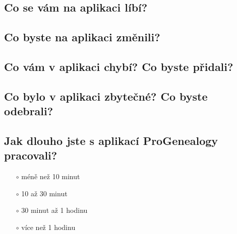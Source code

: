 		\subsection*{Co se vám na aplikaci líbí?}
		\dotfill
		\subsection*{Co byste na aplikaci změnili?}
		\dotfill
		\subsection*{Co vám v aplikaci chybí? Co byste přidali?}
		\dotfill
		\subsection*{Co bylo v aplikaci zbytečné? Co byste odebrali?}
		\dotfill
		\subsection*{Jak dlouho jste s aplikací ProGenealogy pracovali?}
		\begin{itemize}
			\item[$\circ$] méně než 10 minut
			\item[$\circ$] 10 až 30 minut
			\item[$\circ$] 30 minut až 1 hodinu
			\item[$\circ$] více než 1 hodinu
		\end{itemize}
	
	



